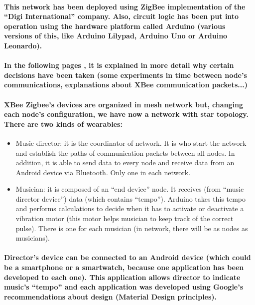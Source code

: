 \paragraph{
This network has been deployed using ZigBee implementation of the “Digi International” company. Also, circuit logic has been put into operation using the hardware platform called Arduino (various versions of this, like Arduino Lilypad, Arduino Uno or Arduino Leonardo).
}

\paragraph{
In the following pages , it is explained in more detail why certain decisions have been taken (some experiments in time between node's communications, explanations about XBee communication packets...)
}

\paragraph{
XBee Zigbee’s devices are organized in mesh network but, changing each node’s configuration, we have now a network with star topology. There are two kinds of wearables:
}

\begin{itemize}
\item Music director: it is the coordinator of network. It is who start the network and establish the paths of communication packets between all nodes. In addition, it is able to send data to every node and receive data from an Android device via Bluetooth. Only one in each network.
\item Musician: it is composed of an “end device” node. It receives (from “music director device”) data (which contains “tempo”). Arduino takes this tempo and performs calculations to decide when it has to activate or deactivate a vibration motor (this motor helps musician to keep track of the correct pulse). There is one for each musician (in network, there will be as nodes as musicians).
\end{itemize}

\paragraph{
Director’s device can be connected to an Android device (which could be a smartphone or a smartwatch, because one application has been developed to each one). This application allows director to indicate music’s “tempo” and each application was developed using Google’s recommendations about design (Material Design principles).
}


